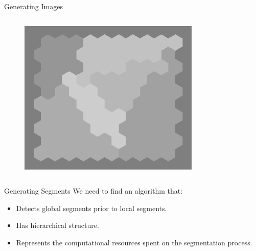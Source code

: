 \documentclass[10pt,xcolor=svgnames]{beamer} %
\begin{document}
\begin{frame}{Generating Images}
\begin{columns}
\begin{figure}
        \includegraphics[width=0.8\textwidth]{pictures/grid_init3.png}
    \end{figure}
\end{columns}
\end{frame}

\begin{frame}{Generating Segments}
        We need to find an algorithm that:
        \begin{itemize}
            \item Detects global segments prior to local segments.
            \item Has hierarchical structure.
            \item Represents the computational resources spent on the segmentation process.
        \end{itemize}
\end{frame}
\end{document}
